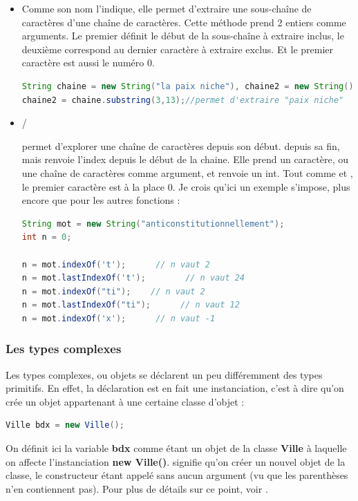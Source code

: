 \documentclass[a4paper,twoside]{article}
\begin{document}
\begin{itemize}
\item {}

Comme son nom l'indique, elle permet d'extraire une sous-chaîne de caractères d'une chaîne de caractères. Cette méthode prend 2 entiers comme arguments. Le premier définit le début de la sous-chaîne à extraire inclus, le deuxième correspond au dernier caractère à extraire exclus. Et le premier caractère est aussi le numéro 0.
\begin{lstlisting}[language=java]
String chaine = new String("la paix niche"), chaine2 = new String();
chaine2 = chaine.substring(3,13);//permet d'extraire "paix niche"
\end{lstlisting}


\item {}/

 permet d'explorer une chaîne de caractères depuis son début.  depuis sa fin, mais renvoie l'index depuis le début de la chaine. Elle prend un caractère, ou une chaîne de caractères comme argument, et renvoie un int. Tout comme  et , le premier caractère est à la place 0. Je crois qu'ici un exemple s'impose, plus encore que pour les autres fonctions :
\begin{lstlisting}[language=java]
String mot = new String("anticonstitutionnellement");
int n = 0;
 
n = mot.indexOf('t');      // n vaut 2
n = mot.lastIndexOf('t');        // n vaut 24
n = mot.indexOf("ti");    // n vaut 2
n = mot.lastIndexOf("ti");      // n vaut 12
n = mot.indexOf('x');      // n vaut -1
\end{lstlisting}
\end{itemize}

\subsubsection{Les types complexes}
Les types complexes, ou objets se déclarent un peu différemment des types primitifs. En effet, la déclaration est en fait une instanciation, c'est à dire qu'on crée un objet appartenant à une certaine classe d'objet :
\begin{lstlisting}[language=java]
Ville bdx = new Ville();
\end{lstlisting}
On définit ici la variable \textbf{bdx} comme étant un objet de la classe \textbf{Ville} à laquelle on affecte l'instanciation \textbf{new Ville()}.  signifie qu'on créer un nouvel objet de la classe, le constructeur étant appelé sans aucun argument (vu que les parenthèses n'en contiennent pas). Pour plus de détails sur ce point, voir .
\end{document}
